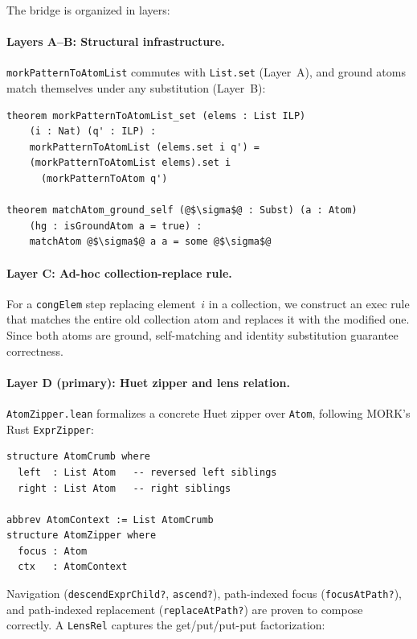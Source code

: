 \documentclass[11pt]{article}
\theoremstyle{definition}
\theoremstyle{remark}
\newcommand{\MORK}{\textup{MORK}}
\begin{document}
The bridge is organized in layers:

\paragraph{Layers A--B: Structural infrastructure.}
\texttt{morkPatternToAtomList} commutes with \texttt{List.set} (Layer~A),
and ground atoms match themselves under any substitution (Layer~B):

\begin{lstlisting}
theorem morkPatternToAtomList_set (elems : List ILP)
    (i : Nat) (q' : ILP) :
    morkPatternToAtomList (elems.set i q') =
    (morkPatternToAtomList elems).set i
      (morkPatternToAtom q')

theorem matchAtom_ground_self (@$\sigma$@ : Subst) (a : Atom)
    (hg : isGroundAtom a = true) :
    matchAtom @$\sigma$@ a a = some @$\sigma$@
\end{lstlisting}

\paragraph{Layer C: Ad-hoc collection-replace rule.}
For a \texttt{congElem} step replacing element~$i$ in a collection,
we construct an exec rule that matches the entire old collection
atom and replaces it with the modified one.  Since both atoms are
ground, self-matching and identity substitution guarantee correctness.

\paragraph{Layer D (primary): Huet zipper and lens relation.}
\texttt{AtomZipper.lean} formalizes a concrete Huet zipper over
\texttt{Atom}, following \MORK{}'s Rust \texttt{ExprZipper}:

\begin{lstlisting}
structure AtomCrumb where
  left  : List Atom   -- reversed left siblings
  right : List Atom   -- right siblings

abbrev AtomContext := List AtomCrumb
structure AtomZipper where
  focus : Atom
  ctx   : AtomContext
\end{lstlisting}

\noindent
Navigation (\texttt{descendExprChild?}, \texttt{ascend?}),
path-indexed focus (\texttt{focusAtPath?}), and
path-indexed replacement (\texttt{replaceAtPath?}) are proven
to compose correctly.  A \texttt{LensRel} captures the
get/put/put-put factorization:
\end{document}
